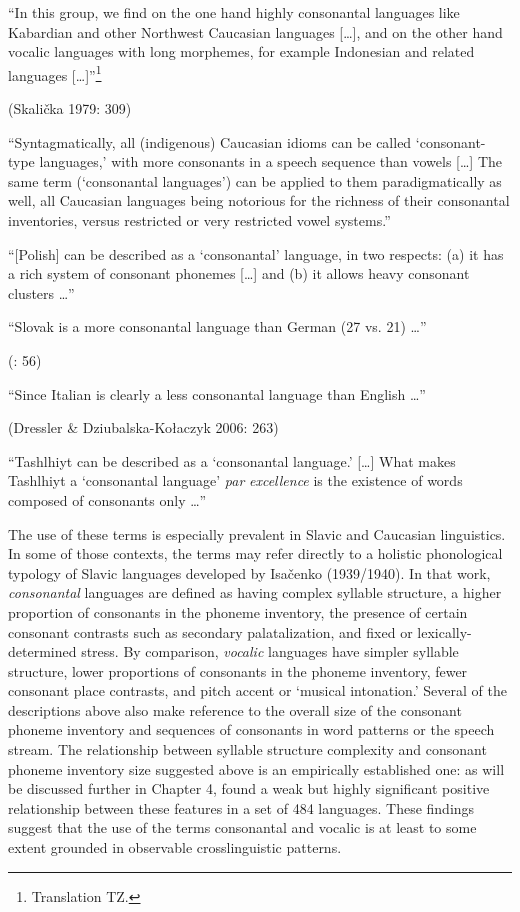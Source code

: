 \ea\label{ex:(1.13)}
   “In this group, we find on the one hand highly consonantal languages like Kabardian and other Northwest Caucasian languages […], and on the other hand vocalic languages with long morphemes, for example Indonesian and related languages […]”\footnote{ \textrm{Translation TZ.}}

(Skalička 1979: 309)
\z

\ea\label{ex:(1.14)}
   “Syntagmatically, all (indigenous) Caucasian idioms can be called ‘consonant-type languages,’ with more consonants in a speech sequence than vowels […] The same term (‘consonantal languages’) can be applied to them paradigmatically as well, all Caucasian languages being notorious for the richness of their consonantal inventories, versus restricted or very restricted vowel systems.” 

\citep[43]{Chirikba2008}
\z

\ea\label{ex:(1.15)}
  “[Polish] can be described as a ‘consonantal’ language, in two respects: (a) it has a rich system of consonant phonemes […] and (b) it allows heavy consonant clusters …” 

\citep[103]{Jassem2003}
\z

\ea\label{ex:(1.16)}
   “Slovak is a more consonantal language than German (27 vs. 21) …”

(\citealt{DresslerEtAl2015}: 56)
\z

\ea\label{ex:(1.17)}
  “Since Italian is clearly a less consonantal language than English …” 

(Dressler \& Dziubalska-Kołaczyk 2006: 263)
\z

\ea\label{ex:(1.18)}
  “Tashlhiyt can be described as a ‘consonantal language.’ […] What makes Tashlhiyt a ‘consonantal language’ \textit{par} \textit{excellence} is the existence of words composed of consonants only …” 
\z

\citep[216]{Ridouane2014}

  The use of these terms is especially prevalent in Slavic and Caucasian linguistics. In some of those contexts, the terms may refer directly to a holistic phonological typology of Slavic languages developed by Isačenko (1939/1940). In that work, \textit{consonantal} languages are defined as having complex syllable structure, a higher proportion of consonants in the phoneme inventory, the presence of certain consonant contrasts such as secondary palatalization, and fixed or lexically-determined stress. By comparison, \textit{vocalic} languages have simpler syllable structure, lower proportions of consonants in the phoneme inventory, fewer consonant place contrasts, and pitch accent or ‘musical intonation.’ Several of the descriptions above also make reference to the overall size of the consonant phoneme inventory and sequences of consonants in word patterns or the speech stream. The relationship between syllable structure complexity and consonant phoneme inventory size suggested above is an empirically established one: as will be discussed further in Chapter 4, \citet{Maddieson2013a} found a weak but highly significant positive relationship between these features in a set of 484 languages. These findings suggest that the use of the terms consonantal and vocalic is at least to some extent grounded in observable crosslinguistic patterns.

